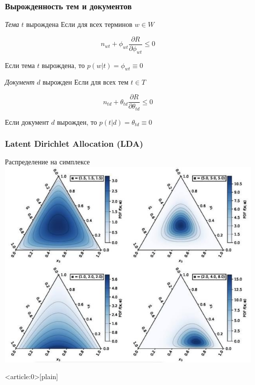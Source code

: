 \documentclass[fullscreen=true, bookmarks=true, hyperref={pdfencoding=unicode}]{beamer}
\begin{document}
\begin{frame}
  \frametitle{Вырожденность тем и документов}

  \begin{block}{{\it Тема} $t$ вырождена}
    Если для всех терминов $w \in W$

    $$ n_{wt} + \phi_{wt} \frac{\partial R}{\partial \phi_{wt}} \leq 0 $$
  \end{block}

  Если тема $t$ вырождена, то $p(w|t) = \phi_{wt} \equiv 0$

  \begin{block}{{\it Документ} $d$ вырожден}
    Если для всех тем $t \in T$

    $$ n_{td} + \theta_{td} \frac{\partial R}{\partial \theta_{td}} \leq 0 $$
  \end{block}

  Если документ $d$ вырожден, то $p(t|d) = \theta_{td} \equiv 0$
\end{frame}


\begin{frame}
  \frametitle{Latent Dirichlet Allocation (LDA)}

  \begin{center}
    Распределение на симплексе
    \includegraphics[keepaspectratio,
                     width=.7\paperwidth]{LDA.jpg}
  \end{center}
\end{frame}


{ %
    \begin{frame}<article:0>[plain]
     \end{frame}
}
\end{document}
